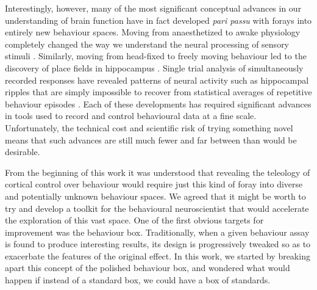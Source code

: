 Interestingly, however, many of the most significant conceptual advances in our understanding of brain function have in fact developed \emph{pari passu} with forays into entirely new behaviour spaces. Moving from anaesthetized to awake physiology completely changed the way we understand the neural processing of sensory stimuli \cite{Sellers2015}. Similarly, moving from head-fixed to freely moving behaviour led to the discovery of place fields in hippocampus \cite{OKeefe1971}. Single trial analysis of simultaneously recorded responses have revealed patterns of neural activity such as hippocampal ripples that are simply impossible to recover from statistical averages of repetitive behaviour episodes \cite{Foster2006,Davidson2009}. Each of these developments has required significant advances in tools used to record and control behavioural data at a fine scale. Unfortunately, the technical cost and scientific risk of trying something novel means that such advances are still much fewer and far between than would be desirable.

From the beginning of this work it was understood that revealing the teleology of cortical control over behaviour would require just this kind of foray into diverse and potentially unknown behaviour spaces. We agreed that it might be worth to try and develop a toolkit for the behavioural neuroscientist that would accelerate the exploration of this vast space. One of the first obvious targets for improvement was the behaviour box. Traditionally, when a given behaviour assay is found to produce interesting results, its design is progressively tweaked so as to exacerbate the features of the original effect. In this work, we started by breaking apart this concept of the polished behaviour box, and wondered what would happen if instead of a standard box, we could have a box of standards.
